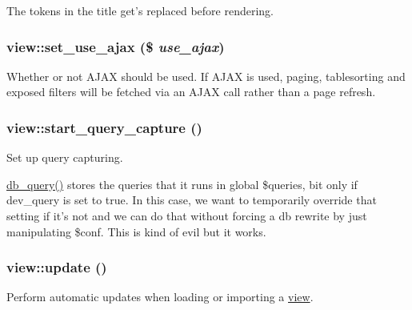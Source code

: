 The tokens in the title get's replaced before rendering. \hypertarget{classview_a77bfc90f75fc5bdbf34cb7f7678c4840}{
\subsubsection[{set\_\-use\_\-ajax}]{\setlength{\rightskip}{0pt plus 5cm}view::set\_\-use\_\-ajax (\$ {\em use\_\-ajax})}}
\label{classview_a77bfc90f75fc5bdbf34cb7f7678c4840}
Whether or not AJAX should be used. If AJAX is used, paging, tablesorting and exposed filters will be fetched via an AJAX call rather than a page refresh. \hypertarget{classview_a1e3efc171324e713e7e130c445dbf84d}{
\subsubsection[{start\_\-query\_\-capture}]{\setlength{\rightskip}{0pt plus 5cm}view::start\_\-query\_\-capture ()}}
\label{classview_a1e3efc171324e713e7e130c445dbf84d}
Set up query capturing.

\hyperlink{group__database_gafa3b6cb2b2f61479cc63a4150c62da9b}{db\_\-query()} stores the queries that it runs in global \$queries, bit only if dev\_\-query is set to true. In this case, we want to temporarily override that setting if it's not and we can do that without forcing a db rewrite by just manipulating \$conf. This is kind of evil but it works. \hypertarget{classview_aa156afa62846e39a15a7e9027d4d58b6}{
\subsubsection[{update}]{\setlength{\rightskip}{0pt plus 5cm}view::update ()}}
\label{classview_aa156afa62846e39a15a7e9027d4d58b6}
Perform automatic updates when loading or importing a \hyperlink{classview}{view}.

